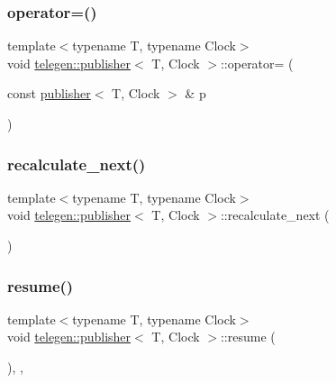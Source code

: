 \subsubsection{\texorpdfstring{operator=()}{operator=()}}
{\footnotesize\ttfamily template$<$typename T, typename Clock$>$ \\
void \hyperlink{classtelegen_1_1publisher}{telegen\+::publisher}$<$ T, Clock $>$\+::operator= (\begin{DoxyParamCaption}\item[{const \hyperlink{classtelegen_1_1publisher}{publisher}$<$ T, Clock $>$ \&}]{p }\end{DoxyParamCaption})\hspace{0.3cm}{\ttfamily [delete]}}

\mbox{\label{classtelegen_1_1publisher_af83e62cfa8e9bbd0b43716ce7d802547}} 
\subsubsection{\texorpdfstring{recalculate\+\_\+next()}{recalculate\_next()}}
{\footnotesize\ttfamily template$<$typename T, typename Clock$>$ \\
void \hyperlink{classtelegen_1_1publisher}{telegen\+::publisher}$<$ T, Clock $>$\+::recalculate\+\_\+next (\begin{DoxyParamCaption}{ }\end{DoxyParamCaption})\hspace{0.3cm}{\ttfamily [inline]}}

\mbox{\label{classtelegen_1_1publisher_a143382f6ff9560be4839c50b3f1dc86c}} 
\subsubsection{\texorpdfstring{resume()}{resume()}}
{\footnotesize\ttfamily template$<$typename T, typename Clock$>$ \\
void \hyperlink{classtelegen_1_1publisher}{telegen\+::publisher}$<$ T, Clock $>$\+::resume (\begin{DoxyParamCaption}{ }\end{DoxyParamCaption})\hspace{0.3cm}{\ttfamily [inline]}, {\ttfamily [override]}, {\ttfamily [virtual]}}



